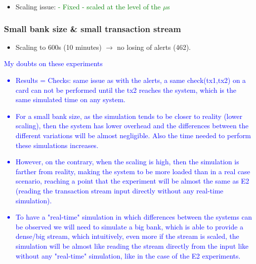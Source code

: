 \begin{itemize}
    \item Scaling issue: \textcolor{green}{- Fixed - scaled at the level of the $\mu$s}
\end{itemize}

\subsubsection{Small bank size \& small transaction stream}

\begin{itemize}
    \item Scaling to 600s (10 minutes) $\rightarrow$ no losing of alerts (462).
\end{itemize}

\textcolor{blue}{
My doubts on these experiments
\begin{itemize}
    \item Results = Checks: same issue as with the alerts, a same check(tx1,tx2) on a card can not be performed until the tx2 reaches the system, which is the same simulated time on any system.
    \item For a small bank size, as the simulation tends to be closer to reality (lower scaling), 
    then the system has lower overhead and the differences between the different variations will be almost negligible. Also the time needed to perform these simulations increases.
    \item However, on the contrary, when the scaling is high, then the simulation is farther from reality, making the system to be more loaded than in a real case scenario, reaching a point that the experiment will be almost the same as E2 (reading the transaction stream input directly without any real-time simulation).
    \item To have a "real-time" simulation in which differences between the systems can be observed we will need to simulate a big bank, which is able to provide a dense/big stream, which intuitively, even more if the stream is scaled, the simulation will be almost like reading the stream directly from the input like without any "real-time" simulation, like in the case of the E2 experiments. 
\end{itemize}
}


